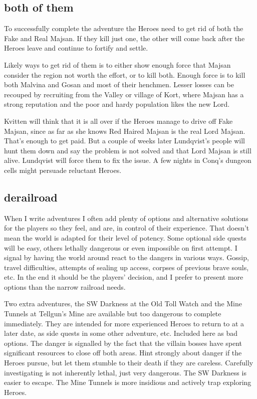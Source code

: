 \subsection*{both of them}
To successfully complete the adventure the Heroes need to get rid of both the Fake and Real Majsan. If they kill just one, the other will come back after the Heroes leave and continue to fortify and settle.

Likely ways to get rid of them is to either show enough force that Majsan consider the region not worth the effort, or to kill both. Enough force is to kill both Malvina and Gosan and most of their henchmen. Lesser losses can be recouped by recruiting from the Valley or village of Kort, where Majsan has a strong reputation and the poor and hardy population likes the new Lord.

Kvitten will think that it is all over if the Heroes manage to drive off Fake Majsan, since as far as she knows Red Haired Majsan is the real Lord Majsan. That's enough to get paid. But a couple of weeks later Lundqvist's people will hunt them down and say the problem is not solved and that Lord Majsan is still alive. Lundqvist will force them to fix the issue. A few nights in Conq's dungeon cells might persuade reluctant Heroes.


\subsection*{derailroad}
When I write adventures I often add plenty of options and alternative solutions for the players so they feel, and are, in control of their experience. That doesn't mean the world is adapted for their level of potency. Some optional side quests will be easy, others lethally dangerous or even impossible on first attempt. I signal by having the world around react to the dangers in various ways. Gossip, travel difficulties, attempts of sealing up access, corpses of previous brave souls, etc. In the end it should be the players' decision, and I prefer to present more options than the narrow railroad needs.

Two extra adventures, the SW Darkness at the Old Toll Watch and the Mine Tunnels at Tellgun's Mine are available but too dangerous to complete immediately. They are intended for more experienced Heroes to return to at a later date, as side quests in some other adventure, etc.
Included here as bad options. The danger is signalled by the fact that the villain bosses have spent significant resources to close off both areas. Hint strongly about danger if the Heroes pursue, but let them stumble to their death if they are careless. Carefully investigating is not inherently lethal, just very dangerous. The SW Darkness is easier to escape. The Mine Tunnels is more insidious and actively trap exploring Heroes.


